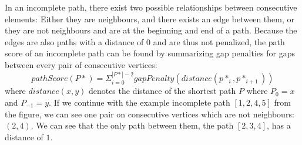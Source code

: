 \documentclass[thesis.tex]{subfiles}
\begin{document}
{\begin{defn}
\end{defn}
In an incomplete path, there exist two possible relationships between consecutive elements: Either they are neighbours, and there exists an edge between them, or they are not neighbours and are at the beginning and end of a path. Because the edges are also paths with a distance of $0$ and are thus not penalized, the path score of an incomplete path can be found by summarizing gap penalties for gaps between every pair of consecutive vertices:
\begin{equation}
  \label{eq:path_score}
  pathScore(P*)=\Sigma^{|P*|-2}_{i=0} gapPenalty(distance(p*_i, p*_{i+1}))
\end{equation}
where $distance(x, y)$ denotes the distance of the shortest path $P$ where $P_0=x$ and $P_{-1}=y$. If we continue with the example incomplete path $[1, 2, 4, 5]$ from the figure, we can see one pair on consecutive vertices which are not neighbours: $(2, 4)$. We can see that the only path between them, the path $[2, 3, 4]$, has a distance of $1$.
\clearpage
\begin{figure}[!ht]
  \begin{mdframed}
    \begin{center}
\end{center}
\end{mdframed}
\end{figure}}
\end{document}
